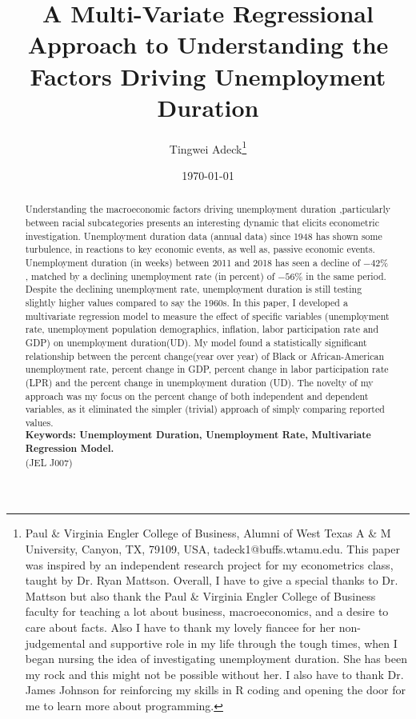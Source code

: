 \documentclass[AEJ]{AEA}
\begin{document}
\title{A Multi-Variate Regressional Approach to Understanding the Factors Driving Unemployment Duration}
\author{Tingwei Adeck\thanks{%
Paul \& Virginia Engler College of Business, Alumni of West Texas A \& M University, Canyon, TX, 79109, USA, tadeck1@buffs.wtamu.edu. This paper was inspired by an independent research project for my econometrics class, taught by Dr. Ryan Mattson. Overall, I have to give a special thanks to Dr. Mattson but also thank the Paul \& Virginia Engler College of Business faculty for teaching a lot about business, macroeconomics, and a desire to care about facts. Also I have to thank my lovely fiancee for her non-judgemental and supportive role in my life through the tough times, when I began nursing the idea of investigating unemployment duration. She has been my rock and this might not be possible without her. I also have to thank Dr. James Johnson for reinforcing my skills in R coding and opening the door for me to learn more about programming.}}
\date{\today}
\JEL{}
\Keywords{}

\begin{abstract}
Understanding the macroeconomic factors driving unemployment duration ,particularly between racial subcategories presents an interesting dynamic that elicits econometric investigation. Unemployment duration data (annual data) since 1948 has shown some turbulence, in reactions to key economic events, as well as, passive economic events. Unemployment duration (in weeks) between 2011 and 2018 has seen a decline of $ - 42\% $, matched by a declining unemployment rate (in percent) of $ - 56\% $ in the same period. Despite the declining unemployment rate, unemployment duration is still testing slightly higher values compared to say the 1960s. In this paper, I developed a multivariate regression model to measure the effect of specific variables (unemployment rate, unemployment population demographics, inflation, labor participation rate and GDP) on unemployment duration(UD). My model found a statistically significant relationship between the percent change(year over year) of Black or African-American unemployment rate, percent change in GDP, percent change in labor participation rate (LPR) and the percent change in unemployment duration (UD). The novelty of my approach was my focus on the percent change of both independent and dependent variables, as it eliminated the simpler (trivial) approach of simply comparing reported values.\\

\textbf{Keywords: Unemployment Duration, Unemployment Rate, Multivariate Regression Model.}\\
(JEL J007)
\end{abstract}
\end{document}
